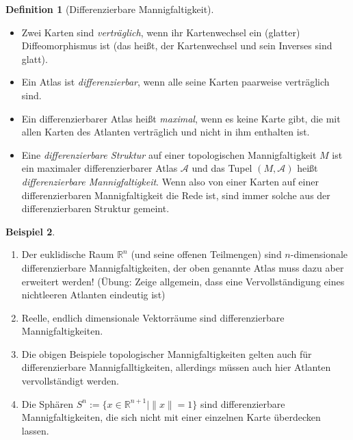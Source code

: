 \documentclass[a4paper]{scrreprt}
\numberwithin{equation}{chapter}
\newcommand{\R}{\mathbb{R}}
\theoremstyle{definition}
\newtheorem{defn}{Definition}[section]
\newtheorem{bsp}[defn]{Beispiel}
\begin{document}
		\begin{defn}[Differenzierbare Mannigfaltigkeit]\hfill
			\begin{itemize}
				\item Zwei Karten sind \emph{verträglich}, wenn ihr Kartenwechsel ein (glatter) Diffeomorphismus ist (das heißt, der Kartenwechsel und sein Inverses sind glatt).
				\item Ein Atlas ist \emph{differenzierbar}, wenn alle seine Karten paarweise verträglich sind.
				\item Ein differenzierbarer Atlas heißt \emph{maximal}, wenn es keine Karte gibt, die mit allen Karten des Atlanten verträglich und nicht in ihm enthalten ist.
				\item Eine \emph{differenzierbare Struktur} auf einer topologischen Mannigfaltigkeit $M$ ist ein maximaler differenzierbarer Atlas $\mathcal{A}$ und das Tupel $(M,\mathcal{A})$ heißt \emph{differenzierbare Mannigfaltigkeit}. Wenn also von einer Karten auf einer differenzierbaren Mannigfaltigkeit die Rede ist, sind immer solche aus der differenzierbaren Struktur gemeint.
			\end{itemize}
		\end{defn}
		\begin{bsp}\hfill 
			\begin{enumerate}
				\item Der euklidische Raum $\R^n$ (und seine offenen Teilmengen) sind $n$-dimensionale differenzierbare Mannigfaltigkeiten, der oben genannte Atlas muss dazu aber erweitert werden! (Übung: Zeige allgemein, dass eine Vervollständigung eines nichtleeren Atlanten eindeutig ist)
				\item Reelle, endlich dimensionale Vektorräume sind differenzierbare Mannigfaltigkeiten.
				\item Die obigen Beispiele topologischer Mannigfaltigkeiten gelten auch für differenzierbare Mannigfalltigkeiten, allerdings müssen auch hier Atlanten vervollständigt werden.
				\item Die Sphären ${S^n:=\lbrace x\in\R^{n+1}\mid \|x\|=1\rbrace}$ sind differenzierbare Mannigfaltigkeiten, die sich nicht mit einer einzelnen Karte überdecken lassen.
			\end{enumerate}
		\end{bsp}
\end{document}
